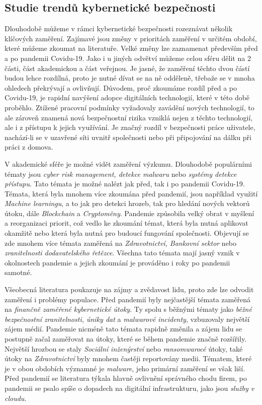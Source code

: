 \subsection{Studie trendů kybernetické bezpečnosti}\label{subsec:studie-trendu-kyberneticke-bezpecnosti}
Dlouhodobě můžeme v rámci kybernetické bezpečnosti rozeznávat několik klíčových zaměření.
Zajímavé jsou změny v prioritách zaměření v určitém období, které můžeme zkoumat na literatuře.
Velké změny lze zaznamenat především před a po pandemii Covidu-19\cite{KUMAR2022102821}.
Jako i u jiných odvětví můžeme celou sféru dělit na 2 části, část akademickou a část veřejnou.
Je jasné, že zaměření těchto dvou částí budou lehce rozdílná, proto je nutné dívat se na ně odděleně, třebaže se v mnoha ohledech překrývají a ovlivňují.
Důvodem, proč zkoumáme rozdíl před a po Covidu-19, je rapidní navýšení adopce digitálních technologií, které v této době proběhlo.
Ztížené pracovní podmínky vyžadovaly zavádění nových technologií, to ale zároveň znamená nová bezpečnostní rizika vzniklá nejen z těchto technologií, ale i z přístupu k jejich využívání.
Je značný rozdíl v bezpečnosti práce uživatele, nachází-li se v uzavřené síti uvnitř společnosti nebo při připojování na dálku při práci z domova.

V akademické sféře je možné vidět zaměření výzkumu.
Dlouhodobě populárními tématy jsou \textit{cyber risk management, detekce malwaru} nebo \textit{systémy detekce přístupu}.
Tato témata je možné nalézt jak před, tak i po pandemii Covidu-19.
Témata, která byla mnohem více zkoumána před pandemií, jsou například využití \textit{Machine learningu}, a to jak pro detekci hrozeb, tak pro hledání nových vektorů útoku, dále \textit{Blockchain} a \textit{Cryptoměny}.
Pandemie způsobila velký obrat v myšlení a reorganizaci priorit, což vedlo ke zkoumání témat, která byla nutná aplikovat okamžitě nebo která byla nutná pro budoucí fungování společnosti.
Objevují se zde mnohem více témata zaměřená na \textit{Zdravotnictví, Bankovní sektor} nebo \textit{zranitelnosti dodavatelského řetězce}.
Všechna tato témata mají jasný vznik v okolnostech pandemie a jejich zkoumání je prováděno i roky po pandemii samotné.\cite{KUMAR2022102821}

Všeobecná literatura poukazuje na zájmy a zvědavost lidu, proto zde lze odvodit zaměření i problémy populace.
Před pandemií byly nejčastější témata zaměřená na \textit{finančně zaměřené kybernetické útoky}.
Ty spolu s běžnými tématy jako \textit{běžné bezpečnostní zranitelnosti, úniky dat} a \textit{malwarové incidenty}, vzbuzovaly největší zájem médií\cite{KUMAR2022102821}.
Pandemie nicméně tato témata rapidně změnila a zájem lidu se postupně začal zaměřovat na útoky, které se během pandemie značně rozšířily.
Největší hrozbou se staly \textit{Sociální inženýrství} nebo \textit{ransomwarocé} útoky, také útoky na \textit{Zdravotnictví} byly mnohem častěji reportovány medii.
Tématem, které je v obou obdobích významné je \textit{malware}, jeho primární zaměření se však liší.
Před pandemií se literatura týkala hlavně ovlivnění správného chodu firem, po pandemii se psalo spíše o dopadech na digitální infrastrukturu, jako jsou \textit{služby v cloudu}.

